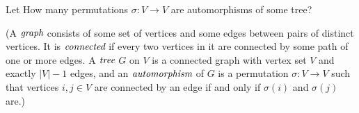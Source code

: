 Let  How many permutations $\sigma : V \to V$ are automorphisms of some tree?

(A $\emph{graph}$ consists of some set of vertices and some edges between pairs of distinct vertices.
It is $\emph{connected}$ if every two vertices in it are connected by some path of one or more edges.
A $\emph{tree}$ $G$ on $V$ is a connected graph with vertex set $V$ and exactly $|V|-1$ edges,
and an $\emph{automorphism}$ of $G$ is a permutation $\sigma : V \to V$ such that
vertices $i,j \in V$ are connected by an edge if and only if $\sigma(i)$ and $\sigma(j)$ are.)